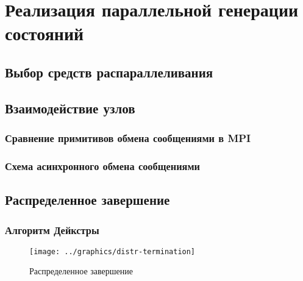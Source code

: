 \chapter{Реализация параллельной генерации состояний}
\label{cha:parmpi}

\section{Выбор средств распараллеливания}
\label{sec:paral-selection}

\section{Взаимодействие узлов}
\label{sec:mpi-interaction}

\subsection{Сравнение примитивов обмена сообщениями в MPI}
\label{sec:mpi-primitives}

\subsection{Схема асинхронного обмена сообщениями}
\label{sec:async-mpi-queue}


\section{Распределенное завершение}
\label{sec:distributed-termination}

\subsection{Алгоритм Дейкстры}
\label{sec:distr-term-dijkstra}

\begin{figure}[ht]
  \centering
  \texttt{[image: ../graphics/distr-termination]}  
  \caption{Распределенное завершение}
\label{fig:dist-term}
\end{figure}


